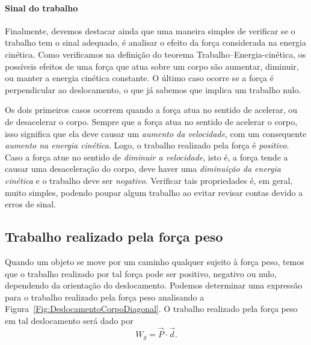 \paragraph{Sinal do trabalho}

Finalmente, devemos destacar ainda que uma maneira simples de verificar se o trabalho tem o sinal adequado, é analisar o efeito da força considerada na energia cinética. Como verificamos na definição do teorema Trabalho--Energia-cinética, os possíveis efeitos de uma força que atua sobre um corpo são aumentar, diminuir, ou manter a energia cinética constante. O último caso ocorre se a força é perpendicular ao deslocamento, o que já sabemos que implica um trabalho nulo.

Os dois primeiros casos ocorrem quando a força atua no sentido de acelerar, ou de desacelerar o corpo. Sempre que a força atua no sentido de acelerar o corpo, isso significa que ela deve causar um \emph{aumento da velocidade}, com um consequente \emph{aumento na energia cinética}. Logo, o trabalho realizado pela força é \emph{positivo}. Caso a força atue no sentido de \emph{diminuir a velocidade}, isto é, a força tende a causar uma desaceleração do corpo, deve haver uma \emph{diminuição da energia cinética} e o trabalho deve ser \emph{negativo}. Verificar tais propriedades é, em geral, muito simples, podendo poupar algum trabalho ao evitar revisar contas devido a erros de sinal.

\subsection{Trabalho realizado pela força peso}

Quando um objeto se move por um caminho qualquer sujeito à força peso, temos que o trabalho realizado por tal força pode ser positivo, negativo ou nulo, dependendo da orientação do deslocamento. Podemos determinar uma expressão para o trabalho realizado pela força peso analisando a Figura~\ref{Fig:DeslocamentoCorpoDiagonal}. O trabalho realizado pela força peso em tal deslocamento será dado por
\begin{equation}
  W_g = \vec{P}\cdot\vec{d}.
\end{equation}

